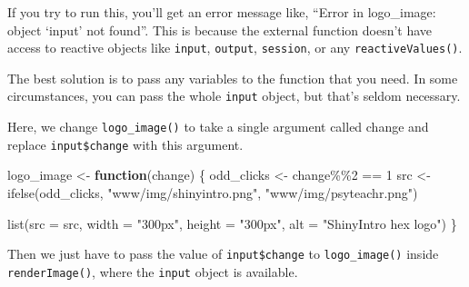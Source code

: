 \documentclass[
  oneside]{book}
\newenvironment{Shaded}{\begin{snugshade}}{\end{snugshade}}
\newcommand{\AttributeTok}[1]{\textcolor[rgb]{0.77,0.63,0.00}{#1}}
\newcommand{\ConstantTok}[1]{\textcolor[rgb]{0.00,0.00,0.00}{#1}}
\newcommand{\ControlFlowTok}[1]{\textcolor[rgb]{0.13,0.29,0.53}{\textbf{#1}}}
\newcommand{\DecValTok}[1]{\textcolor[rgb]{0.00,0.00,0.81}{#1}}
\newcommand{\FunctionTok}[1]{\textcolor[rgb]{0.00,0.00,0.00}{#1}}
\newcommand{\NormalTok}[1]{#1}
\newcommand{\OtherTok}[1]{\textcolor[rgb]{0.56,0.35,0.01}{#1}}
\newcommand{\SpecialCharTok}[1]{\textcolor[rgb]{0.00,0.00,0.00}{#1}}
\newcommand{\StringTok}[1]{\textcolor[rgb]{0.31,0.60,0.02}{#1}}
\begin{document}
If you try to run this, you'll get an error message like, ``Error in logo\_image: object `input' not found''. This is because the external function doesn't have access to reactive objects like \texttt{input}, \texttt{output}, \texttt{session}, or any \texttt{reactiveValues}\texttt{()}.

The best solution is to pass any variables to the function that you need. In some circumstances, you can pass the whole \texttt{input} object, but that's seldom necessary.

Here, we change \texttt{logo\_image}\texttt{()} to take a single argument called \AttributeTok{change} and replace \texttt{input\$change} with this argument.

\begin{Shaded}
\begin{Highlighting}[]
\NormalTok{logo\_image }\OtherTok{\textless{}{-}} \ControlFlowTok{function}\NormalTok{(change) \{}
\NormalTok{  odd\_clicks }\OtherTok{\textless{}{-}}\NormalTok{ change}\SpecialCharTok{\%\%}\DecValTok{2} \SpecialCharTok{==} \DecValTok{1}
\NormalTok{  src }\OtherTok{\textless{}{-}} \FunctionTok{ifelse}\NormalTok{(odd\_clicks, }
                \StringTok{"www/img/shinyintro.png"}\NormalTok{, }
                \StringTok{"www/img/psyteachr.png"}\NormalTok{)}
  
  \FunctionTok{list}\NormalTok{(}\AttributeTok{src =}\NormalTok{ src,}
       \AttributeTok{width =} \StringTok{"300px"}\NormalTok{,}
       \AttributeTok{height =} \StringTok{"300px"}\NormalTok{,}
       \AttributeTok{alt =} \StringTok{"ShinyIntro hex logo"}\NormalTok{)}
\NormalTok{\}}
\end{Highlighting}
\end{Shaded}

Then we just have to pass the value of \texttt{input\$change} to \texttt{logo\_image}\texttt{()} inside \texttt{renderImage}\texttt{()}, where the \texttt{input} object is available.

\begin{Shaded}
\end{Shaded}
\end{document}
